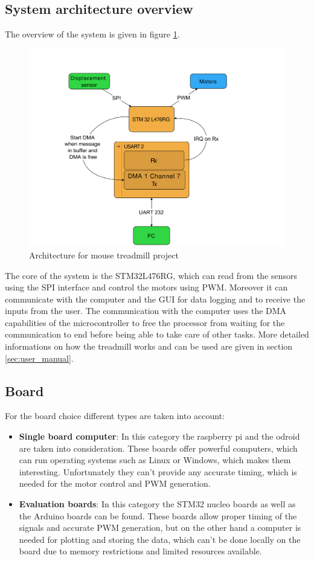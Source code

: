 \documentclass[12pt,a4paper, twoside]{article}
\begin{document}
\subsection{System architecture overview} \label{sec:archi}
The overview of the system is given in figure \ref{fig:arch}.
\begin{figure}[H]
	\centering
	\includegraphics[width=0.9\linewidth]{fig/archi.pdf}
	\caption{Architecture for mouse treadmill project}
	\label{fig:arch}
\end{figure}
The core of the system is the STM32L476RG, which can read from the sensors using the SPI interface and control the motors using PWM. Moreover it can communicate with the computer and the GUI for data logging and to receive the inputs from the user. The communication with the computer uses the DMA capabilities of the microcontroller to free the processor from waiting for the communication to end before being able to take care of other tasks. More detailed informations on how the treadmill works and can be used are given in section \ref{sec:user_manual}.

\subsection{Board} \label{sec:board}
For the board choice different types are taken into account:
\begin{itemize}
	\item \textbf{Single board computer}: In this category the raspberry pi and the odroid are taken into consideration. These boards offer powerful computers, which can run operating systems such as Linux or Windows, which makes them interesting. Unfortunately they can't provide any accurate timing,  which is needed for the motor control and PWM generation.
	\item \textbf{Evaluation boards}: In this category the STM32 nucleo boards as well as the Arduino boards can be found. These boards allow proper timing of the signals and accurate PWM generation, but on the other hand a computer is needed for plotting and storing the data, which can't be done locally on the board due to memory restrictions and limited resources available. 
\end{itemize}
\end{document}
